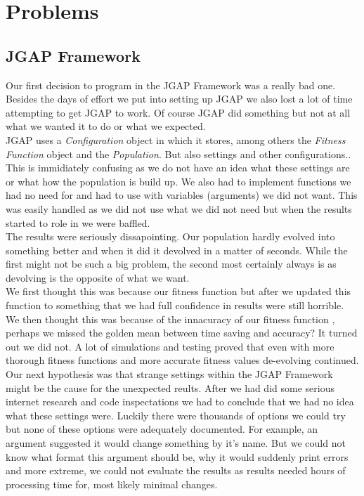 \documentclass[a4paper,10pt]{article}
\begin{document}
\section{Problems}
\label{sec:problems}
\subsection{JGAP Framework}
Our first decision to program in the JGAP Framework was a really bad one. Besides the days of effort we put into setting up JGAP we also lost a lot of time
attempting to get JGAP to work. Of course JGAP did something but not at all what we wanted it to do or what we expected. \\

JGAP uses a \textit{Configuration} object in which it stores, among others the \textit{Fitness Function} object and the \textit{Population}. But also settings 
and other configurations.. This is immidiately confusing as we do not have an idea what these settings are or what how the population is build up. We also had to 
implement functions we had no need for and had to use with variables (arguments) we did not want. This was easily handled as we did not use what we did not need but when 
the results started to role in we were baffled. \\

The results were seriously dissapointing. Our population hardly evolved into something better and when it did it devolved in a matter of seconds. While the first might not
be such a big problem, the second most certainly always is as devolving is the opposite of what we want.\\

We first thought this was because our fitness function but after
we updated this function to something that we had full confidence in results were still horrible. \\

We then thought this was because of the innacuracy of our fitness function
, perhaps we missed the golden mean between time saving and accuracy? It turned out we did not. A lot of simulations and testing proved that even with more thorough 
fitness functions and more accurate fitness values de-evolving continued. \\

Our next hypothesis was that strange settings within the JGAP Framework might be the cause for the unexpected reults. After we had did some serious internet research 
and code inspectations we had to conclude that 
we had no idea what these settings were. Luckily there were thousands of options we could try but none of these options were adequately documented. For example, an 
argument suggested it would change something by it's name. But we could not know what format this argument should be, why it would suddenly print errors and more extreme, 
we could not evaluate the results as results needed hours of processing time for, most likely minimal changes. \\
\end{document}
